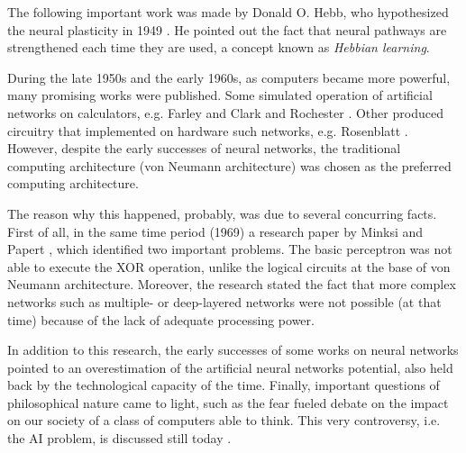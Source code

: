 The following important work was made by Donald O. Hebb, who hypothesized the neural plasticity in 1949 \cite{hebb1949organization}.
He pointed out the fact that neural pathways are strengthened each time they are used, a concept known as \textit{Hebbian learning}.

During the late 1950s and the early 1960s, as computers became more powerful, many promising works were published.
Some simulated operation of artificial networks on calculators, e.g. Farley and Clark \cite{Farley1954} and Rochester \cite{Rochester1956}.
Other produced circuitry that implemented on hardware such networks, e.g. Rosenblatt \cite{frank1957perceptron,Rosenblatt1958}.
However, despite the early successes of neural networks, the traditional computing architecture (von Neumann architecture) was chosen as the preferred computing architecture.

The reason why this happened, probably, was due to several concurring facts.
First of all, in the same time period (1969) a research paper by Minksi and Papert \cite{minski1969perceptrons}, which identified two important problems.
The basic perceptron was not able to execute the \ac{XOR} operation, unlike the logical circuits at the base of von Neumann architecture.
Moreover, the research stated the fact that more complex networks such as multiple- or deep-layered networks were not possible (at that time) because of the lack of adequate processing power.


In addition to this research, the early successes of some works on neural networks pointed to an overestimation of the artificial neural networks potential, also held back by the technological capacity of the time.
Finally, important questions of philosophical nature came to light, such as the fear fueled debate on the impact on our society of a class of computers able to think.
This very controversy, i.e. the \ac{AI} problem, is discussed still today \cite{stanford.edu}.

